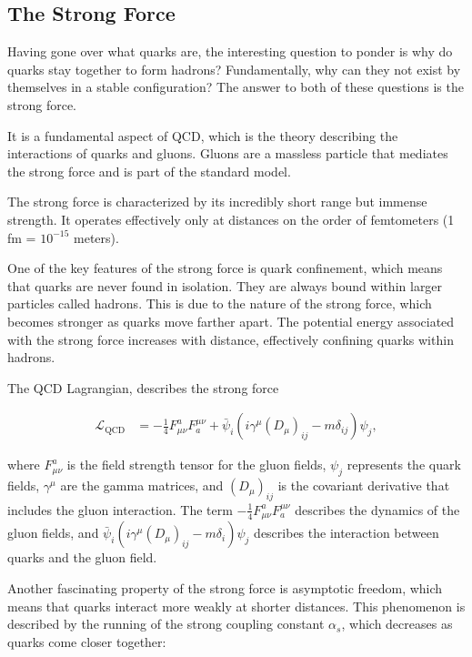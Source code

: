 \subsection{The Strong Force}

Having gone over what quarks are, the interesting question to ponder is why do quarks stay together to form hadrons?
Fundamentally, why can they not exist by themselves in a stable configuration?
The answer to both of these questions is the strong force.

It is a fundamental aspect of QCD, which is the theory describing the interactions of quarks and gluons.
Gluons are a massless particle that mediates the strong force and is part of the standard model.

The strong force is characterized by its incredibly short range but immense strength.
It operates effectively only at distances on the order of femtometers (1 fm = \(10^{-15}\) meters).

One of the key features of the strong force is quark confinement, which means that quarks are never found in isolation.
They are always bound within larger particles called hadrons.
This is due to the nature of the strong force, which becomes stronger as quarks move farther apart.
The potential energy associated with the strong force increases with distance, effectively confining quarks within hadrons.

The QCD Lagrangian, describes the strong force

\begin{align}
  \mathcal{L}_{\text{QCD}} &= -\frac{1}{4} F_{\mu\nu}^a F_a^{\mu\nu} + \bar{\psi}_i (i \gamma^\mu (D_\mu)_{ij} - m\delta_{ij}) \psi_j,
\end{align}

where \( F_{\mu\nu}^a \) is the field strength tensor for the gluon fields, \( \psi_j \) represents the quark fields, \( \gamma^\mu \) are the gamma matrices, and \( (D_\mu)_{ij} \) is the covariant derivative that includes the gluon interaction.
The term \( -\frac{1}{4} F_{\mu\nu}^a F_a^{\mu\nu} \) describes the dynamics of the gluon fields, and \( \bar{\psi}_i (i \gamma^\mu (D_\mu)_{ij} - m\delta_i) \psi_j \) describes the interaction between quarks and the gluon field.

Another fascinating property of the strong force is asymptotic freedom, which means that quarks interact more weakly at shorter distances.
This phenomenon is described by the running of the strong coupling constant \( \alpha_s \), which decreases as quarks come closer together:

